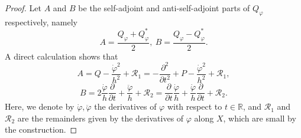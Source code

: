 \documentclass[12pt, reqno]{amsart}
\theoremstyle{plain}%
\theoremstyle{definition}
\theoremstyle{remark}
\numberwithin{equation}{section}
\newcommand{\R}{\mathbb{R}}
\begin{document}
\begin{proof}
	Let $A$ and $B$ be the self-adjoint and anti-self-adjoint parts of $Q_\varphi$ respectively, namely
	$$A=\frac{Q_\varphi+Q_\varphi^*}{2},\ B=\frac{Q_\varphi-Q_\varphi^*}{2}.$$
	A direct calculation  shows that
	$$A=Q-\frac{\dot\varphi^2}{h^2}+\mathscr R_1=-\frac{\partial^2}{\partial t^2}+P-\frac{\dot\varphi^2}{h^2}+\mathscr R_1,$$
	$$B=2\frac{\dot\varphi}{h}\frac{\partial}{\partial t}+\frac{\ddot \varphi}{h}+\mathscr R_2=\frac{\partial}{\partial t}\frac{\dot\varphi}{h} + \frac{\dot\varphi}{h}\frac{\partial}{\partial t} +\mathscr R_2.$$
	Here, we denote by $\dot\varphi, \ddot\varphi$  the derivatives of $\varphi$ with respect to $t\in\R$, and  $\mathscr R_1$ and $\mathscr R_2$ are the remainders given by the derivatives of $\varphi$ along $X$, which are small by the construction.
	

\end{proof}
\end{document}
